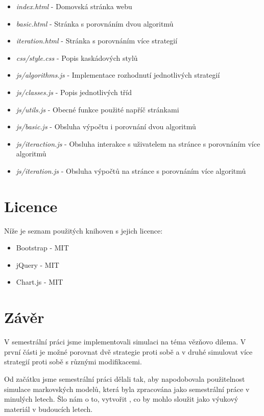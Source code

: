 \documentclass[12pt, a4paper]{article}
\begin{document}
\begin{itemize}
  \item \textit{index.html} - Domovská stránka webu
  \item \textit{basic.html} - Stránka s porovnáním dvou algoritmů
  \item \textit{iteration.html} - Stránka s porovnáním více strategií
  \item \textit{css/style.css} - Popis kaskádových stylů
  \item \textit{js/algorithms.js} - Implementace rozhodnutí jednotlivých strategií
  \item \textit{js/classes.js} - Popis jednotlivých tříd
  \item \textit{js/utils.js} - Obecné funkce použité napříč stránkami
  \item \textit{js/basic.js} - Obsluha výpočtu i porovnání dvou algoritmů
  \item \textit{js/iteraction.js} - Obsluha interakce s uživatelem na stránce s porovnáním více algoritmů
  \item \textit{js/iteration.js} - Obsluha výpočtů na stránce s porovnáním více algoritmů
\end{itemize}

\section{Licence}
\noindent Níže je seznam použitých knihoven s jejich licence:
\begin{itemize}
  \item Bootstrap - MIT
  \item jQuery - MIT
  \item Chart.js - MIT
\end{itemize}



\section{Závěr}
V semestrální práci jsme implementovali simulaci na téma vězňovo dilema. V první části je možné porovnat dvě strategie proti sobě a v druhé simulovat více strategií proti sobě s různými modifikacemi. 

Od začátku jsme semestrální práci dělali tak, aby napodobovala použitelnost simulace markovských modelů, která byla zpracována jako semestrální práce v minulých letech. Šlo nám o to, vytvořit , co by mohlo sloužit jako výukový materiál v budoucích letech.
\end{document}
